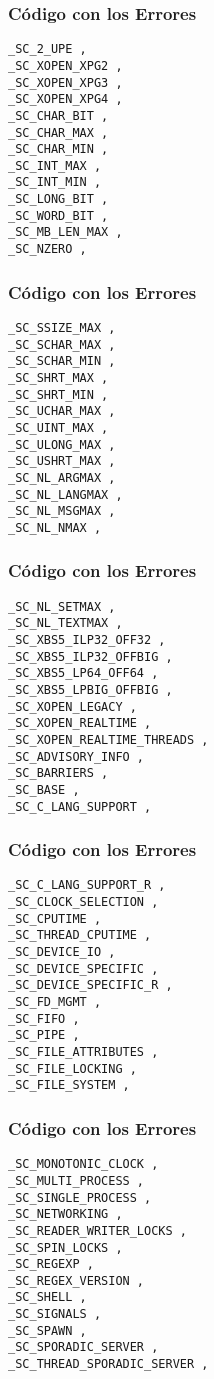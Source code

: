 \documentclass{beamer}
\begin{document}
\begin{frame}[fragile]
\frametitle{C\'odigo con los Errores}
\begin{lstlisting}[style=CStyle]
_SC_2_UPE , 
_SC_XOPEN_XPG2 , 
_SC_XOPEN_XPG3 , 
_SC_XOPEN_XPG4 , 
_SC_CHAR_BIT , 
_SC_CHAR_MAX , 
_SC_CHAR_MIN , 
_SC_INT_MAX , 
_SC_INT_MIN , 
_SC_LONG_BIT , 
_SC_WORD_BIT , 
_SC_MB_LEN_MAX , 
_SC_NZERO , 
\end{lstlisting}
\end{frame}
\begin{frame}[fragile]
\frametitle{C\'odigo con los Errores}
\begin{lstlisting}[style=CStyle]
_SC_SSIZE_MAX , 
_SC_SCHAR_MAX , 
_SC_SCHAR_MIN , 
_SC_SHRT_MAX , 
_SC_SHRT_MIN , 
_SC_UCHAR_MAX , 
_SC_UINT_MAX , 
_SC_ULONG_MAX , 
_SC_USHRT_MAX , 
_SC_NL_ARGMAX , 
_SC_NL_LANGMAX , 
_SC_NL_MSGMAX , 
_SC_NL_NMAX , 
\end{lstlisting}
\end{frame}
\begin{frame}[fragile]
\frametitle{C\'odigo con los Errores}
\begin{lstlisting}[style=CStyle]
_SC_NL_SETMAX , 
_SC_NL_TEXTMAX , 
_SC_XBS5_ILP32_OFF32 , 
_SC_XBS5_ILP32_OFFBIG , 
_SC_XBS5_LP64_OFF64 , 
_SC_XBS5_LPBIG_OFFBIG , 
_SC_XOPEN_LEGACY , 
_SC_XOPEN_REALTIME , 
_SC_XOPEN_REALTIME_THREADS , 
_SC_ADVISORY_INFO , 
_SC_BARRIERS , 
_SC_BASE , 
_SC_C_LANG_SUPPORT , 
\end{lstlisting}
\end{frame}
\begin{frame}[fragile]
\frametitle{C\'odigo con los Errores}
\begin{lstlisting}[style=CStyle]
_SC_C_LANG_SUPPORT_R , 
_SC_CLOCK_SELECTION , 
_SC_CPUTIME , 
_SC_THREAD_CPUTIME , 
_SC_DEVICE_IO , 
_SC_DEVICE_SPECIFIC , 
_SC_DEVICE_SPECIFIC_R , 
_SC_FD_MGMT , 
_SC_FIFO , 
_SC_PIPE , 
_SC_FILE_ATTRIBUTES , 
_SC_FILE_LOCKING , 
_SC_FILE_SYSTEM , 
\end{lstlisting}
\end{frame}
\begin{frame}[fragile]
\frametitle{C\'odigo con los Errores}
\begin{lstlisting}[style=CStyle]
_SC_MONOTONIC_CLOCK , 
_SC_MULTI_PROCESS , 
_SC_SINGLE_PROCESS , 
_SC_NETWORKING , 
_SC_READER_WRITER_LOCKS , 
_SC_SPIN_LOCKS , 
_SC_REGEXP , 
_SC_REGEX_VERSION , 
_SC_SHELL , 
_SC_SIGNALS , 
_SC_SPAWN , 
_SC_SPORADIC_SERVER , 
_SC_THREAD_SPORADIC_SERVER , 
\end{lstlisting}
\end{frame}
\end{document}

